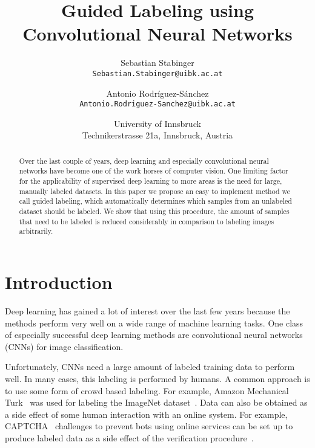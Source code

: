 \documentclass[10pt,twocolumn,letterpaper]{article}
\begin{document}
\title{Guided Labeling using Convolutional Neural Networks}

\author{Sebastian Stabinger\\
  {\tt\small Sebastian.Stabinger@uibk.ac.at}
  \and
  Antonio Rodr\'iguez-S\'anchez\\
  {\tt\small Antonio.Rodriguez-Sanchez@uibk.ac.at}
  \and
  University of Innsbruck\\
  Technikerstrasse 21a, Innsbruck, Austria\\
}

\maketitle

\begin{abstract}
  Over the last couple of years, deep learning and especially
  convolutional neural networks have become one of the work horses of
  computer vision. One limiting factor for the applicability of
  supervised deep learning to more areas is the need for large,
  manually labeled datasets. In this paper we propose an easy to
  implement method we call guided labeling, which automatically
  determines which samples from an unlabeled dataset should be
  labeled. We show that using this procedure, the amount of samples
  that need to be labeled is reduced considerably in comparison to
  labeling images arbitrarily.
\end{abstract}

\section{Introduction}
Deep learning has gained a lot of interest over the last few years
because the methods perform very well on a wide range of machine
learning tasks. One class of especially successful deep learning
methods are convolutional neural networks (CNNs) for image
classification.

Unfortunately, CNNs need a large amount of labeled training data to
perform well. In many cases, this labeling is performed by humans. A
common approach is to use some form of crowd based labeling. For
example, Amazon Mechanical Turk~\cite{turk2012amazon} was used for
labeling the ImageNet dataset~\cite{deng2009imagenet}. Data can also
be obtained as a side effect of some human interaction with an online
system. For example, CAPTCHA~\cite{von2003captcha} challenges to
prevent bots using online services can be set up to produce labeled
data as a side effect of the verification
procedure~\cite{faymonville2009captcha}.
\end{document}
